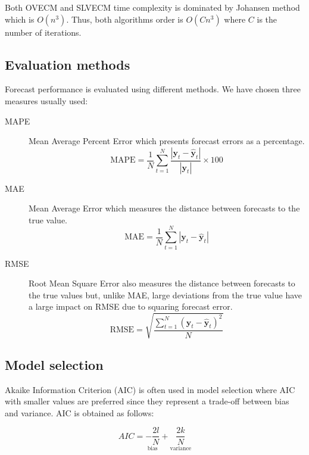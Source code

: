 Both OVECM and SLVECM time complexity is dominated by Johansen method which is
$O(n^3)$. Thus, both algorithms order is $O(Cn^3)$ where $C$ is the number of
iterations. 

\subsection{Evaluation methods} \label{sec:evaluation}

Forecast performance is evaluated using different methods. We have chosen three
measures usually used:
\begin{description}
\item[MAPE] Mean Average Percent Error which presents forecast errors as a
percentage.
\begin{equation}\label{eq:MAPE}
\text{MAPE} = \frac{1}{N} \sum_{t=1}^{N} 
\frac{\left|\mathbf{y}_t-\hat{\mathbf{y}}_t\right|}{\left|\mathbf{y}_t\right|}
 \times 100 
\end{equation}
\item[MAE] Mean Average Error which measures the distance between forecasts to the
true value.
\begin{equation}\label{eq:MAE}
\text{MAE} = \frac{1}{N} \sum_{t=1}^{N} 
\left| 
\mathbf{y}_t-\hat{\mathbf{y}}_t
\right| 
\end{equation}
\item[RMSE] Root Mean Square Error also measures the distance between forecasts
to the true values but, unlike MAE, large deviations from the true value have a
large impact on RMSE due to squaring forecast error.
\begin{equation}\label{eq:RMSE}
\text{RMSE} = \sqrt{
\frac{\displaystyle \sum_{t=1}^{N} (\mathbf{y}_t-\hat{\mathbf{y}}_t)^2}{N}}
\end{equation}
\end{description}


\subsection{Model selection} \label{sec:pselection}
Akaike Information Criterion (AIC) is often used in model selection where AIC
with smaller values are preferred since they represent a trade-off between bias
and variance.  AIC is obtained as follows:

\begin{equation}
\label{eq:aicformula}
AIC = \underset{\text{bias}}{-\frac{2l}{N}} + 
\underset{\text{variance}}{\frac{2k}{N}}
\end{equation}

